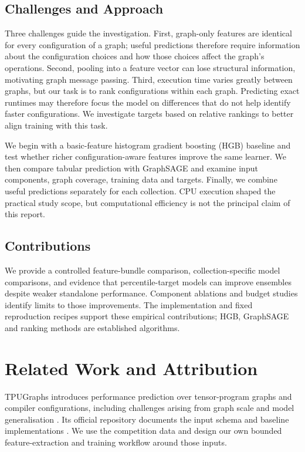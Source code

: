 \documentclass[letterpaper]{article}
\begin{document}
\subsection{Challenges and Approach}
Three challenges guide the investigation. First, graph-only features are identical for every configuration of a graph; useful predictions therefore require information about the configuration choices and how those choices affect the graph's operations. Second, pooling into a feature vector can lose structural information, motivating graph message passing. Third, execution time varies greatly between graphs, but our task is to rank configurations within each graph. Predicting exact runtimes may therefore focus the model on differences that do not help identify faster configurations. We investigate targets based on relative rankings to better align training with this task.

We begin with a basic-feature histogram gradient boosting (HGB) baseline and test whether richer configuration-aware features improve the same learner. We then compare tabular prediction with GraphSAGE and examine input components, graph coverage, training data and targets. Finally, we combine useful predictions separately for each collection. CPU execution shaped the practical study scope, but computational efficiency is not the principal claim of this report.

\subsection{Contributions}
We provide a controlled feature-bundle comparison, collection-specific model comparisons, and evidence that percentile-target models can improve ensembles despite weaker standalone performance. Component ablations and budget studies identify limits to those improvements. The implementation and fixed reproduction recipes support these empirical contributions; HGB, GraphSAGE and ranking methods are established algorithms.

\section{Related Work and Attribution}
TPUGraphs introduces performance prediction over tensor-program graphs and compiler configurations, including challenges arising from graph scale and model generalisation \citep{tpugraphs}. Its official repository documents the input schema and baseline implementations \citep{tpudata}. We use the competition data and design our own bounded feature-extraction and training workflow around those inputs.
\end{document}
